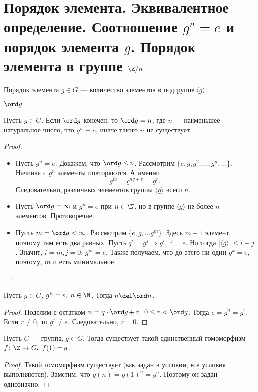 % 
% 
\section{Порядок элемента. Эквивалентное определение. Соотношение $ g^{n} = e$ и порядок элемента $ g$. Порядок элемента в группе  $ \Z / n$}
\begin{defn}
    {\sf Порядок элемента } $ g \in G$ --- количество элементов в подгруппе $ \langle g \rangle$.  
    \begin{name}
        $\ord g$
    \end{name}
\end{defn}
\begin{lm}
    Пусть $ g \in G$. Если $ \ord g$ конечен, то  $ \ord g =n$, где  $ n $ --- наименьшее натуральное число, что  $ g^{n} = e$, иначе такого $ n$ не существует.
\end{lm}
\begin{proof}
    $ $
    \begin{itemize}
	\item	Пусть $ g^{n} = e$. Докажем, что $ \ord g \le n$. Рассмотрим $ \{e, g, g^2, \ldots ,g^{n}, \ldots \}$. Начиная с $ g^n$ элементы повторяются. А именно
	\[
	g^{m } = g^{nq + r } = g^{r}
	.\] 
	Следовательно, различных элементов группы $ \langle g \rangle$ всего $ n$.
    \item Пусть $ \ord g = \infty$ и $ g^{n} = e$ при $ n \in  \N$. но в группе $ \langle g \rangle $ не более $ n$ элементов. Противоречие.
    \item Пусть $ m = \ord g < \infty$. Рассмотрим $ \{e, g, \ldots g^{m}\}$. Здесь $ m+1$ элемент, поэтому там есть два равных. Пусть  $ g^{i} = g^{j} \Longrightarrow g^{i-j} = e$. Но тогда $ \left| \langle g \rangle \right| \le i-j$. Значит, $ i = m, j=0$,  $ g^{m} = e$. Также получаем, что до этого ни один $ g^{k} = e$, поэтому, $ m$ и есть минимальное.
    \end{itemize}
\end{proof}
\begin{st}
    Пусть $ g \in G$, $ g^{n} = e, ~n \in \N$. Тогда $ n \del \ord n$. 
\end{st}
\begin{proof}
    Поделим с остатком $ n = q\cdot \ord g + r, ~ 0 \le r < \ord g$. Тогда $ e = g^{n} = g^{r}$. Если $ r \ne 0$, то $ g^{r} \ne e$. Следовательно, $ r = 0$.
\end{proof}

\begin{lm}
    Пусть $ G$ --- группа, $ g \in G$. Тогда существует такой единственный гомоморфизм  $ f\colon \Z \to  G, ~ f(1) = g$.
\end{lm}
\begin{proof}
    Такой гомоморфизм существует (как задан в условии, все условия выполняются). Заметим, что $ g(n) = g(1)^{n} = g^{n}$. Поэтому он задан однозначно.
\end{proof}

